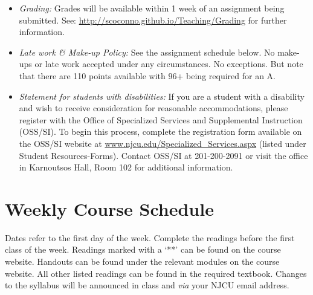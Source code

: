 \documentclass[article,oneside]{memoir}
\begin{document}
\begin{itemize}
\item \textit{Grading:} Grades will be available within 1 week of an assignment being submitted. See: \href{http://scoconno.github.io/Teaching/Grading}{http://scoconno.github.io/Teaching/Grading} for further information.


\item \textit{Late work \& Make-up Policy:} See the assignment schedule below. No make-ups or late work accepted under any circumstances. No exceptions. But note that there are 110 points available with 96+ being required for an A.


\item \textit{Statement for students with disabilities:} If you are a student with a disability and wish to receive consideration for reasonable accommodations, please register with the Office of Specialized Services and Supplemental Instruction (OSS/SI). To begin this process, complete the registration form available on the OSS/SI website at
\href{http://www.njcu.edu/Specialized_Services.aspx}{www.njcu.edu/Specialized\_Services.aspx}
(listed under Student Resources-Forms). Contact OSS/SI at 201-200-2091
or visit the office in Karnoutsos Hall, Room 102 for additional
information.

\end{itemize}



\section{Weekly Course Schedule}
Dates refer to the first day of the week. Complete the readings before the first class of the week. Readings marked with a `**' can be found on the course website. Handouts can be found under the relevant modules on the course website. All other listed readings can be found in the required textbook. Changes to the syllabus will be announced in class and \emph{via} your NJCU email address.
\end{document}
